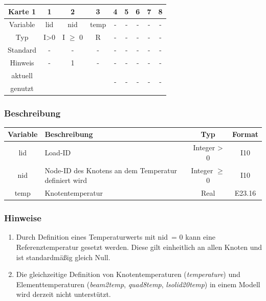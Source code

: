 \documentclass[11pt,titlepage,listof=totoc,bibliography=totoc,twoside]{scrreprt}
\begin{document}
{{\begin{table}[htbp]
\centering
\begin{tabularx}{\textwidth}{cCCCCCCCC}
\toprule
Karte 1         & 1     & 2          & 3          & 4  & 5  & 6  & 7  & 8  \\
\midrule
Variable        & lid   & nid        & temp       & -  & -  & -  & -  & -  \\
Typ             & I>0   & I $\geq$ 0 & R          & -  & -  & -  & -  & -  \\
Standard        & -     & -          & -          & -  & -  & -  & -  & -  \\
Hinweis         & -     & 1          & -          & -  & -  & -  & -  & -  \\
aktuell         &  &  &  &   &   &   &   &   \\
genutzt \\
\bottomrule
\end{tabularx}
\end{table}

\subsubsection{Beschreibung}

\begin{tabularx}{\textwidth}{cXcc}
\toprule
Variable  & Beschreibung  & Typ          & Format  \\
\midrule
lid       & Load-ID       & Integer > 0  & I10     \\
nid       & Node-ID des Knotens an dem Temperatur definiert wird & Integer $\geq$ 0 & I10  \\
temp      & Knotentemperatur & Real      & E23.16  \\
\bottomrule
\end{tabularx}

\subsubsection{Hinweise}

\begin{enumerate}
 \item Durch Definition eines Temperaturwerts mit nid~= 0 kann eine Referenztemperatur gesetzt werden. Diese gilt einheitlich an allen Knoten und ist standardmäßig gleich Null.
 \item Die gleichzeitige Definition von Knotentemperaturen (\emph{temperature}) und Elementtemperaturen (\emph{beam2temp}, \emph{quad8temp}, \emph{lsolid20temp}) in einem Modell wird derzeit nicht unterstützt.
\end{enumerate}

}}
\end{document}
